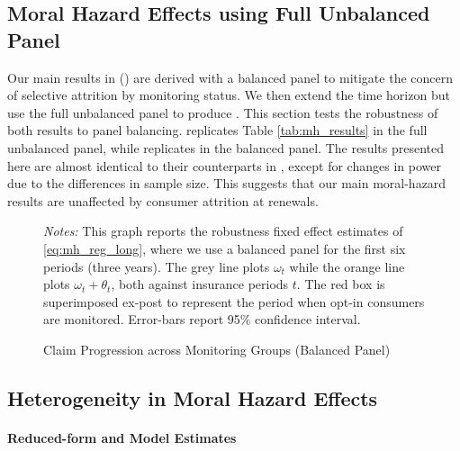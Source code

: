 \setcounter{figure}{0}
\setcounter{table}{0}
\subsection{Moral Hazard Effects using Full Unbalanced Panel}\label{subsec:app-unbal}

Our main results in  () are derived with a balanced panel to mitigate the concern of selective attrition by monitoring status. We then extend the time horizon but use the full unbalanced panel to produce . This section tests the robustness of both results to panel balancing.   replicates Table \ref{tab:mh_results} in the full unbalanced panel, while  replicates  in the balanced panel. The results presented here are almost identical to their counterparts in , except for changes in power due to the differences in sample size. This suggests that our main moral-hazard results are unaffected by consumer attrition at renewals.

\begin{figure}[htbp!]
\centering
{}
\caption{Claim Progression across Monitoring Groups (Balanced Panel) \label{fig:rf-illus-bal}}
\vspace{0.1cm}
\begin{minipage}{0.95\textwidth} %
    {\footnotesize \emph{Notes: }This graph reports the robustness fixed effect estimates of \cref{eq:mh_reg_long}, where we use a balanced panel for the first six periods (three years). The grey line plots $\omega_t$ while the orange line plots $\omega_t + \theta_t$, both against insurance periods $t$. The red box is superimposed ex-post to represent the period when opt-in consumers are monitored. Error-bars report 95\% confidence interval. \par}
\end{minipage}
\par
\end{figure}


\newpage
\subsection{Heterogeneity in Moral Hazard Effects}\label{subsec:app-mhhet}

\paragraph{Reduced-form and Model Estimates}

